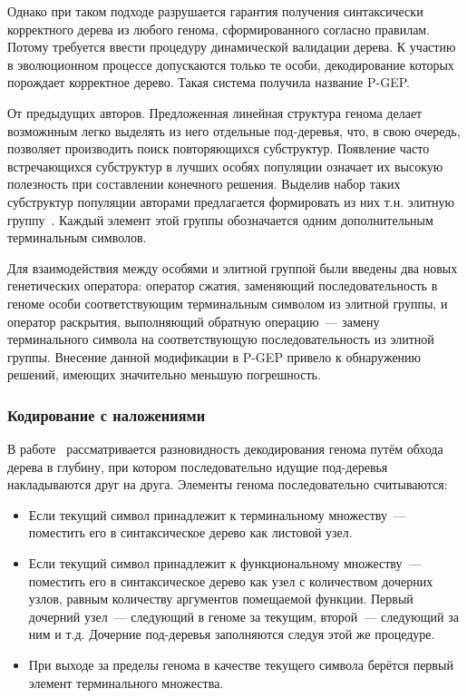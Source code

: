 Однако при таком подходе разрушается гарантия получения синтаксически корректного дерева из любого генома, сформированного согласно правилам. Потому требуется ввести процедуру динамической валидации дерева. К участию в эволюционном процессе допускаются только те особи, декодирование которых порождает корректное дерево. Такая система получила название P-GEP.

От предыдущих авторов. Предложенная линейная структура генома делает возможнным легко выделять из него отдельные под-деревья, что, в свою очередь, позволяет производить поиск повторяющихся субструктур. Появление часто встречающихся субструктур в лучших особях популяции означает их высокую полезность при составлении конечного решения. Выделив набор таких субструктур популяции авторами предлагается формировать из них т.н. элитную группу~\cite{Substructures(ICMLA05)_XLi}. Каждый элемент этой группы обозначается одним дополнительным терминальным символов.

Для взаимодействия между особями и элитной группой были введены два новых генетических оператора: оператор сжатия, заменяющий последовательность в геноме особи соответствующим терминальным символом из элитной группы, и оператор раскрытия, выполняющий обратную операцию~--- замену терминального символа на соответствующую последовательность из элитной группы.
Внесение данной модификации в P-GEP привело к обнаружению решений, имеющих значительно меньшую погрешность.


\subsubsection{Кодирование с наложениями}

В работе~\cite{conf/icnc/PengTZY05} рассматривается разновидность декодирования генома путём обхода дерева в глубину, при котором последовательно идущие под-деревья накладываются друг на друга. Элементы генома последовательно считываются:
\begin{itemize}
  \item Если текущий символ принадлежит к терминальному множеству~--- поместить его в синтаксическое дерево как листовой узел.
  \item Если текущий символ принадлежит к функциональному множеству~--- поместить его в синтаксическое дерево как узел с количеством дочерних узлов, равным количеству аргументов помещаемой функции. Первый дочерний узел~--- следующий в геноме за текущим, второй~--- следующий за ним и т.д. Дочерние под-деревья заполняются следуя этой же процедуре.
  \item При выходе за пределы генома в качестве текущего символа берётся первый элемент терминального множества.
\end{itemize}

